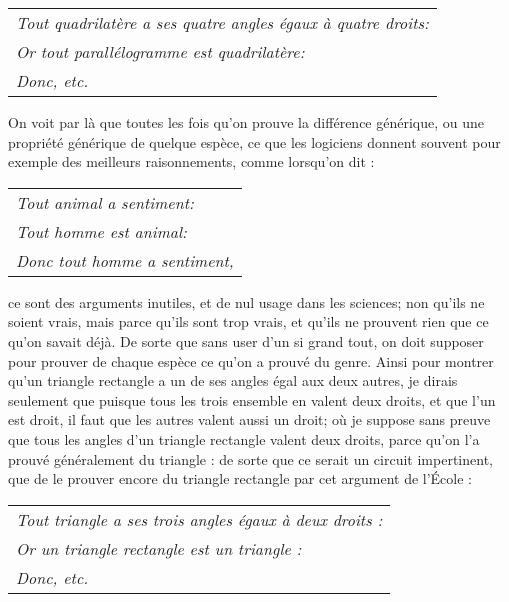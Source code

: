 	\begin{tabularx}{\textwidth}{X}
		\emph{Tout quadrilatère a ses quatre angles égaux à quatre droits:} \\
		\emph{Or tout parallélogramme est quadrilatère:} \\
		\emph{Donc, etc.} \\
	\end{tabularx}

On voit par là que toutes les fois qu'on prouve la différence générique, ou une propriété générique de quelque espèce, ce que les logiciens donnent souvent pour exemple des meilleurs raisonnements, comme lorsqu'on dit :

	\begin{tabularx}{\textwidth}{X}
		\emph{Tout animal a sentiment:} \\
		\emph{Tout homme est animal:} \\
		\emph{Donc tout homme a sentiment,} \\
\end{tabularx}

ce sont des arguments inutiles, et de nul usage dans les sciences; non qu'ils ne soient vrais, mais parce qu'ils sont trop vrais, et qu'ils ne prouvent rien que ce qu'on savait déjà. De sorte que sans user d'un si grand tout, on doit supposer pour prouver de chaque espèce ce qu'on a prouvé du genre. Ainsi pour montrer qu'un triangle rectangle a un de ses angles égal aux deux autres, je dirais seulement que puisque tous les trois ensemble en valent deux droits, et que l'un est droit, il faut que les autres valent aussi un droit; où je suppose sans preuve que tous les angles d'un triangle rectangle valent deux droits, parce qu'on l'a prouvé généralement du triangle : de sorte que ce serait un circuit impertinent, que de le prouver encore du triangle rectangle par cet argument de l'École :

	\begin{tabularx}{\textwidth}{X}
		\emph{Tout triangle a ses trois angles égaux à deux droits :} \\
		\emph{Or un triangle rectangle est un triangle :} \\
		\emph{Donc, etc.} \\
\end{tabularx}


